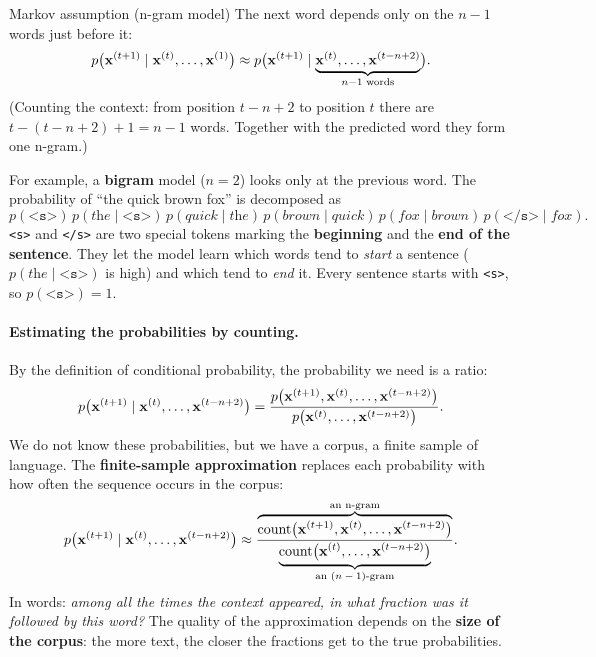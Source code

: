 \begin{nbdef}{Markov assumption (n-gram model)}
The next word depends only on the $n-1$ words just before it:
\[
  p\bigl(\mathbf{x}^{(t+1)} \mid \mathbf{x}^{(t)}, \ldots, \mathbf{x}^{(1)}\bigr) \approx
  p\bigl(\mathbf{x}^{(t+1)} \mid
  \underbrace{\mathbf{x}^{(t)}, \ldots, \mathbf{x}^{(t-n+2)}}_{n-1 \text{ words}}\bigr).
\]
(Counting the context: from position $t-n+2$ to position $t$ there are
$t - (t-n+2) + 1 = n-1$ words. Together with the predicted word they form one n-gram.)
\end{nbdef}

For example, a \textbf{bigram} model ($n = 2$) looks only at the previous word. The
probability of ``the quick brown fox'' is decomposed as
\[
  p(\texttt{<s>}) \, p(\textit{the} \mid \texttt{<s>}) \, p(\textit{quick} \mid \textit{the})
  \, p(\textit{brown} \mid \textit{quick}) \, p(\textit{fox} \mid \textit{brown}) \,
  p(\texttt{</s>} \mid \textit{fox}).
\]
\texttt{<s>} and \texttt{</s>} are two special tokens marking the \textbf{beginning} and
the \textbf{end of the sentence}. They let the model learn which words tend to
\emph{start} a sentence ($p(\textit{the} \mid \texttt{<s>})$ is high) and which tend to
\emph{end} it. Every sentence starts with \texttt{<s>}, so $p(\texttt{<s>}) = 1$.

\paragraph{Estimating the probabilities by counting.}
By the definition of conditional probability, the probability we need is a ratio:
\[
  p\bigl(\mathbf{x}^{(t+1)} \mid \mathbf{x}^{(t)}, \ldots, \mathbf{x}^{(t-n+2)}\bigr) =
  \frac{p\bigl(\mathbf{x}^{(t+1)}, \mathbf{x}^{(t)}, \ldots, \mathbf{x}^{(t-n+2)}\bigr)}
       {p\bigl(\mathbf{x}^{(t)}, \ldots, \mathbf{x}^{(t-n+2)}\bigr)} .
\]
We do not know these probabilities, but we have a corpus, a finite sample of language.
The \textbf{finite-sample approximation} replaces each probability with how often the
sequence occurs in the corpus:
\[
  p\bigl(\mathbf{x}^{(t+1)} \mid \mathbf{x}^{(t)}, \ldots, \mathbf{x}^{(t-n+2)}\bigr) \approx
  \frac{\overbrace{\text{count}\bigl(\mathbf{x}^{(t+1)}, \mathbf{x}^{(t)}, \ldots,
        \mathbf{x}^{(t-n+2)}\bigr)}^{\text{an n-gram}}}
       {\underbrace{\text{count}\bigl(\mathbf{x}^{(t)}, \ldots,
        \mathbf{x}^{(t-n+2)}\bigr)}_{\text{an $(n-1)$-gram}}} .
\]
In words: \emph{among all the times the context appeared, in what fraction was it
followed by this word?} The quality of the approximation depends on the
\textbf{size of the corpus}: the more text, the closer the fractions get to the true
probabilities.

